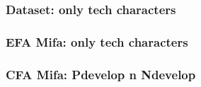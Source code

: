 \documentclass[
]{article}
\begin{document}
\hypertarget{dataset-only-tech-characters}{%
\subsubsection{Dataset: only tech
characters}\label{dataset-only-tech-characters}}

\hypertarget{efa-mifa-only-tech-characters}{%
\subsubsection{EFA Mifa: only tech
characters}\label{efa-mifa-only-tech-characters}}

\hypertarget{cfa-mifa-pdevelop-n-ndevelop}{%
\subsubsection{CFA Mifa: Pdevelop n
Ndevelop}\label{cfa-mifa-pdevelop-n-ndevelop}}
\end{document}
